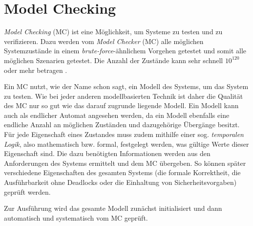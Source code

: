 \section{Model Checking}\label{sec:modelchecking}

\emph{Model Checking} (MC) ist eine Möglichkeit, um Systeme zu testen und zu verifizieren. Dazu werden vom \emph{Model Checker} (MC) alle möglichen Systemzustände in einem \emph{brute-force}-ähnlichem Vorgehen getestet und somit alle möglichen Szenarien getestet. Die Anzahl der Zustände kann sehr schnell $ 10^{120} $ oder mehr betragen \cite{Grumberg1999,Baier2008}.


Ein MC nutzt, wie der Name schon sagt, ein Modell des Systems, um das System zu testen. Wie bei jeder anderen modellbasierten Technik ist daher die Qualität des MC nur so gut wie das darauf zugrunde liegende Modell. Ein Modell kann auch als endlicher Automat angesehen werden, da ein Modell ebenfalls eine endliche Anzahl an möglichen Zuständen und dazugehörige Übergänge besitzt. Für jede Eigenschaft eines Zustandes muss zudem mithilfe einer sog. \emph{temporalen Logik}, also mathematisch bzw. formal, festgelegt werden, was gültige Werte dieser Eigenschaft sind. Die dazu benötigten Informationen werden aus den Anforderungen des Systems ermittelt und dem MC übergeben. So können später verschiedene Eigenschaften des gesamten Systems (\zB die formale Korrektheit, die Ausführbarkeit ohne Deadlocks oder die Einhaltung von Sicherheitsvorgaben) geprüft werden.

Zur Ausführung wird das gesamte Modell zunächst initialisiert und dann automatisch und systematisch vom MC geprüft.

